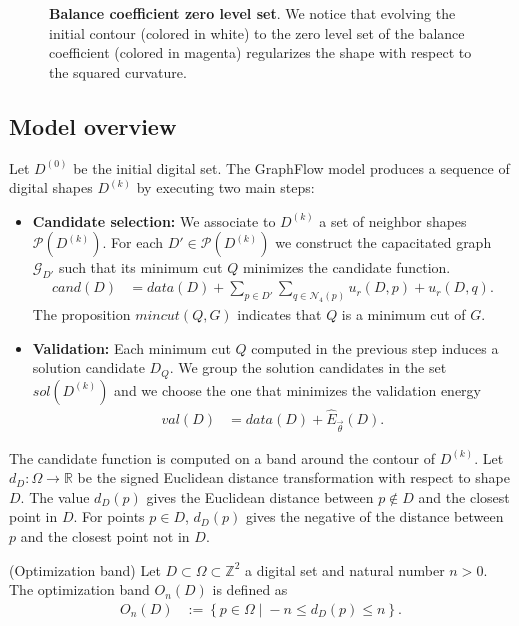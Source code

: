 \documentclass[runningheads]{llncs}
\begin{document}
{\begin{figure}
 \caption{\textbf{Balance coefficient zero level set}. We notice that evolving the initial contour (colored in white) to the zero level set of the balance coefficient (colored in magenta) regularizes the shape with respect to the squared curvature.}
 \label{fig:balance-coefficient-zero-level-set}
 \end{figure}}
%

\subsection{Model overview}
Let $D^{(0)}$ be the initial digital set. The GraphFlow model produces a sequence of digital shapes $D^{(k)}$ by executing two main steps:
%
\begin{itemize}
\item[]{\textbf{Candidate selection:} We associate to $D^{(k)}$ a set of neighbor shapes $\mathcal{P}(D^{(k)})$. For
    each $D' \in \mathcal{P}(D^{(k)})$ we construct the capacitated graph $\mathcal{G}_{D'}$ such that its minimum cut $Q$ minimizes the candidate function.
\begin{align}
	cand(D) &= data(D) + \sum_{p \in D'}\sum_{q \in \mathcal{N}_{4}(p)}{ u_r(D,p) +u_r(D,q) }. \label{eq:candidate-function}
\end{align}
The proposition $mincut(Q,G)$ indicates that $Q$ is a minimum cut of $G$.}
\vspace{1em}
\item[]{\textbf{Validation:} Each minimum cut $Q$ computed in the previous step induces a solution candidate $D_{Q}$. We group the solution candidates in the set $sol(D^{(k)})$ and we choose the one that minimizes the validation energy
\begin{align}
	val(D) &= data(D) + \hat{E}_{\vec{\theta}}( D ). \label{eq:validation-function}
\end{align}
}
\end{itemize}
%
The candidate function is computed on a band around the contour of $D^{(k)}$. Let $d_{D}:\Omega \rightarrow \mathbb{R}$ be the signed Euclidean distance transformation with respect to shape $D$. The value $d_{D}(p)$ gives the Euclidean distance between $p \notin D$ and the closest point in $D$. For points $p \in D$, $d_{D}(p)$ gives the negative of the distance between $p$ and the closest point not in $D$.
%
\begin{definition}{(Optimization band)}
Let $D \subset \Omega \subset \mathbb{Z}^2$ a digital set and natural number $n>0$. The optimization band $O_n(D)$ is defined as
\begin{align*}
	O_n(D) &:=\left\{ p \in \Omega \; | \; -n \leq d_{D}(p) \leq n \right\}.
\end{align*}
\end{definition}
\end{document}
